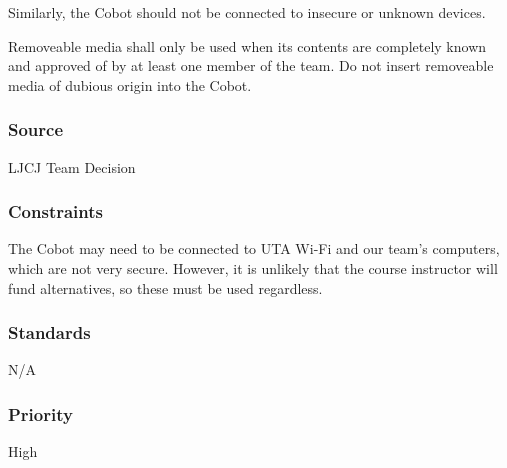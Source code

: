 Similarly, the Cobot should not be connected to insecure or unknown devices.

Removeable media shall only be used when its contents are completely known and approved of by at least one member of the team. Do not insert removeable media of dubious origin into the Cobot. 
\subsubsection{Source}
LJCJ Team Decision
\subsubsection{Constraints}
The Cobot may need to be connected to UTA Wi-Fi and our team's computers, which are not very secure. However, it is unlikely that the course instructor will fund alternatives, so these must be used regardless. 
\subsubsection{Standards}
N/A
\subsubsection{Priority}
High